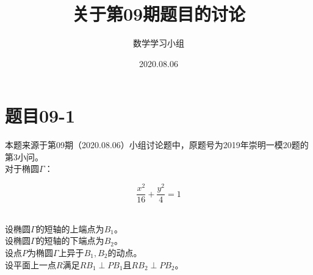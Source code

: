\documentclass[UTF8]{ctexart}
\title{关于第09期题目的讨论}
\author{数学学习小组}
\date{2020.08.06}
\begin{document}
\maketitle

\newpage

\tableofcontents

\newpage

\setlength{\parindent}{0pt}
\setlength{\columnseprule}{0.4pt}
\setlength{\columnsep}{40pt}

\section{题目09-1}
    本题来源于第09期（2020.08.06）小组讨论题中，原题号为2019年崇明一模20题的第3小问。\\[3mm]
    对于椭圆$\Gamma$：
    \begin{large}
        \begin{equation*}
            \frac{x^2}{16}+\frac{y^2}{4}=1
        \end{equation*}
    \end{large}\\
    设椭圆$\Gamma$的短轴的上端点为$B_1$。\\[3mm]
    设椭圆$\Gamma$的短轴的下端点为$B_2$。\\[3mm]
    设点$P$为椭圆$\Gamma$上异于$B_1,B_2$的动点。\\[3mm]
    设平面上一点$R$满足$RB_1\perp PB_1$且$RB_2\perp PB_2$。
\end{document}
